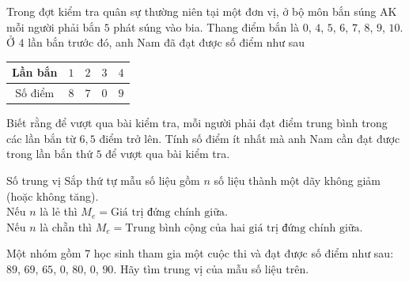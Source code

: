 \begin{vd}%
	Trong đợt kiểm tra quân sự thường niên tại một đơn vị, ở bộ môn bắn súng AK mỗi người phải bắn $5$ phát súng vào bia. Thang điểm bắn là $0$, $4$, $5$, $6$, $7$, $8$, $9$, $10$. Ở $4$ lần bắn trước đó, anh Nam đã đạt được số điểm như sau
	\begin{center}
		\begin{tabular}{|c|c|c|c|c|}
			\hline
			Lần bắn & $1$ & $2$ & $3$ & $4$ \\
			\hline
			Số điểm & $8$ & $7$ & $0$ & $9$  \\
			\hline
	\end{tabular}
	\end{center}
	Biết rằng để vượt qua bài kiểm tra, mỗi người phải đạt điểm trung bình trong các lần bắn từ $6{,}5$ điểm trở lên. Tính số điểm ít nhất mà anh Nam cần đạt được trong lần bắn thứ $5$ để vượt qua bài kiểm tra.
\end{vd}
\begin{dang}{Số trung vị}
	Sắp thứ tự mẫu số liệu gồm $n$ số liệu thành một dãy không giảm (hoặc không tăng).\\
	Nếu $n$ là lẻ thì $M_e=\text{Giá trị đứng chính giữa}$.\\
	Nếu $n$ là chẵn thì $M_e=\text{Trung bình cộng của hai giá trị đứng chính giữa}$.
\end{dang}
\begin{vd}%
	Một nhóm gồm 7 học sinh tham gia một cuộc thi và đạt được số điểm như sau: $89$, $69$, $65$, $0$, $80$, $0$, $90$.
	Hãy tìm trung vị của mẫu số liệu trên.
\end{vd}

